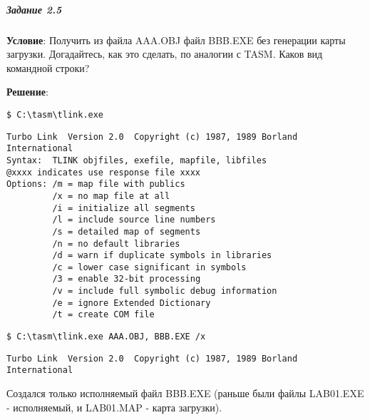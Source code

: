 \subparagraph{Задание 2.5}

\textbf{Условие}: Получить из файла AAA.OBJ файл BBB.EXE без генерации карты  загрузки. Догадайтесь, как это сделать, по аналогии с TASM. Каков вид командной строки?

\textbf{Решение}: 

\begin{lstlisting}[language=Terminal]
$ C:\tasm\tlink.exe
\end{lstlisting}

\begin{lstlisting}[language=Out]
Turbo Link  Version 2.0  Copyright (c) 1987, 1989 Borland International
Syntax:  TLINK objfiles, exefile, mapfile, libfiles
@xxxx indicates use response file xxxx
Options: /m = map file with publics
         /x = no map file at all
         /i = initialize all segments
         /l = include source line numbers
         /s = detailed map of segments
         /n = no default libraries
         /d = warn if duplicate symbols in libraries
         /c = lower case significant in symbols
         /3 = enable 32-bit processing
         /v = include full symbolic debug information
         /e = ignore Extended Dictionary
         /t = create COM file
\end{lstlisting}

\begin{lstlisting}[language=Terminal]
$ C:\tasm\tlink.exe AAA.OBJ, BBB.EXE /x
\end{lstlisting}
   
\begin{lstlisting}[language=Out]
Turbo Link  Version 2.0  Copyright (c) 1987, 1989 Borland International
\end{lstlisting}

Создался только исполняемый файл BBB.EXE (раньше были файлы LAB01.EXE - исполняемый, и LAB01.MAP - карта загрузки).
